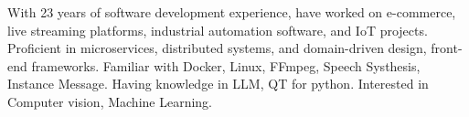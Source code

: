 

\begin{cvparagraph}

With 23 years of software development experience, have worked on e-commerce, live streaming platforms, industrial automation software, and IoT projects. 
Proficient in microservices, distributed systems, and domain-driven design, front-end frameworks.
Familiar with Docker, Linux, FFmpeg, Speech Systhesis, Instance Message.
Having knowledge in LLM, QT for python. 
Interested in Computer vision, Machine Learning. 
\end{cvparagraph}
